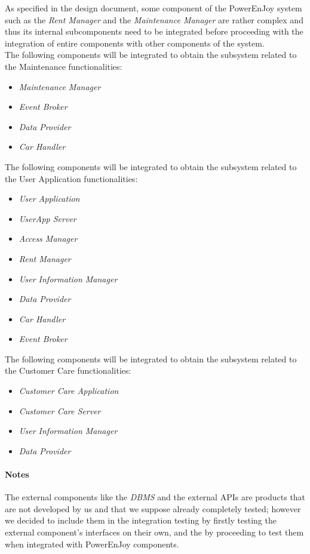 As specified in the design document, some component of the PowerEnJoy system such as the \emph{Rent Manager} and the \emph{Maintenance Manager} are rather complex and thus its internal subcomponents need to be integrated before proceeding with the integration of entire components with other components of the system.\\

The following components will be integrated to obtain the subsystem related to the Maintenance functionalities:

\begin{itemize}
	\item \emph{Maintenance Manager}
	\item \emph{Event Broker}
	\item \emph{Data Provider}
	\item \emph{Car Handler}
\end{itemize}

The following components will be integrated to obtain the subsystem related to the User Application functionalities:

\begin{itemize}
	\item \emph{User Application}
	\item \emph{UserApp Server}
	\item \emph{Access Manager}
	\item \emph{Rent Manager}
	\item \emph{User Information Manager}
	\item \emph{Data Provider}
	\item \emph{Car Handler}
	\item \emph{Event Broker}
\end{itemize}

The following components will be integrated to obtain the subsystem related to the Customer Care functionalities:

\begin{itemize}
	\item \emph{Customer Care Application}
	\item \emph{Customer Care Server}
	\item \emph{User Information Manager}
	\item \emph{Data Provider}
\end{itemize}

\paragraph{Notes}
The external components like the \emph{DBMS} and the external APIs are products that are not developed by us and that we suppose already completely tested; however we decided to include them in the integration testing by firstly testing the external component's interfaces on their own, and the by proceeding to test them when integrated with PowerEnJoy components.

